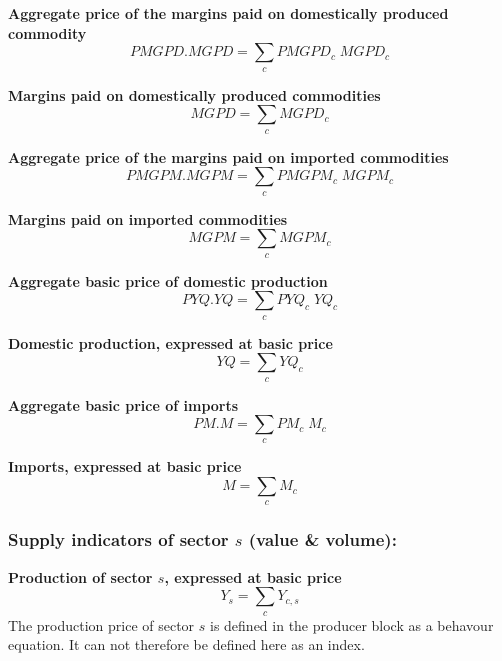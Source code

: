 \documentclass[12pt]{article}
\numberwithin{equation}{section}
\begin{document}
\noindent \textbf{Aggregate price of the margins paid on domestically produced commodity} 
\begin{dmath}
PMGPD . MGPD = \sum_{c} PMGPD_{c} \; MGPD_{c}
\label{SU.mdlPMGPD}
\end{dmath}

\noindent \textbf{Margins paid on domestically produced commodities} 
\begin{dmath}
MGPD = \sum_{c} MGPD_{c}
\label{SU.mdlMGPD}
\end{dmath}

\noindent \textbf{Aggregate price of the margins paid on imported commodities} 
\begin{dmath}
PMGPM . MGPM = \sum_{c} PMGPM_{c} \; MGPM_{c}
\label{SU.mdlPMGPM}
\end{dmath}

\noindent \textbf{Margins paid on imported commodities} 
\begin{dmath}
MGPM = \sum_{c} MGPM_{c}
\label{SU.mdlMGPM}
\end{dmath}

\noindent \textbf{Aggregate basic price of domestic production} 
\begin{dmath}
PYQ . YQ = \sum_{c} PYQ_{c} \; YQ_{c}
\label{SU.mdlPYQ}
\end{dmath}

\noindent \textbf{Domestic production, expressed at basic price} 
\begin{dmath}
YQ = \sum_{c} YQ_{c}
\label{SU.mdlYQ}
\end{dmath}

\noindent \textbf{Aggregate basic price of imports} 
\begin{dmath}
PM . M = \sum_{c} PM_{c} \; M_{c}
\label{SU.mdlPM}
\end{dmath}

\noindent \textbf{Imports, expressed at basic price} 
\begin{dmath}
M = \sum_{c} M_{c}
\label{SU.mdlM}
\end{dmath}




\subsubsection{Supply indicators of sector $s$ (value \& volume):}



\noindent \textbf{Production of sector $s$, expressed at basic price} 
\begin{dmath}
Y_{s} = \sum_{c} Y_{c, s}
\label{SU.mdlY[s]}
\end{dmath}
The production price of sector $s$ is defined in the producer block as a behavour equation. It can not therefore be defined here as an index. \\
\end{document}
